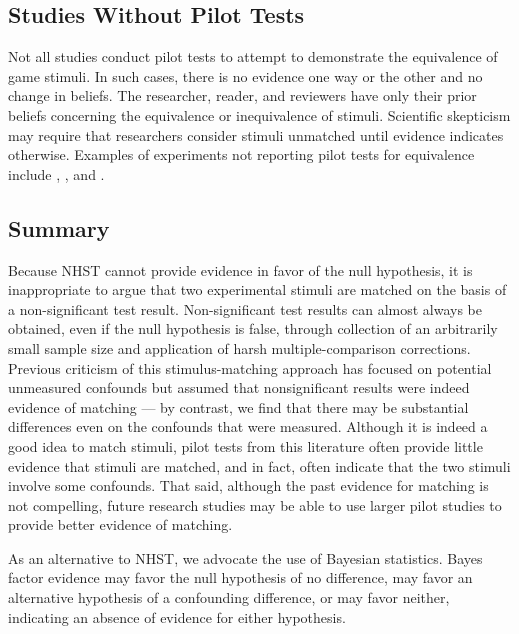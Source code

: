 \documentclass[man]{apa6}
\begin{document}
\subsection{Studies Without Pilot Tests}
Not all studies conduct pilot tests to attempt to demonstrate the equivalence of game stimuli. In such cases, there is no evidence one way or the other and no change in beliefs. The researcher, reader, and reviewers have only their prior beliefs concerning the equivalence or inequivalence of stimuli. Scientific skepticism may require that researchers consider stimuli unmatched until evidence indicates otherwise. Examples of experiments not reporting pilot tests for equivalence include \citet{Bartholow:Anderson:2002}, \citet{Bartholow:etal:2005}, and \citet{Hasan:etal:2012}. 

\subsection{Summary}
Because NHST cannot provide evidence in favor of the null hypothesis, it is inappropriate to argue that two experimental stimuli are matched on the basis of a non-significant test result.  Non-significant test results can almost always be obtained, even if the null hypothesis is false, through collection of an arbitrarily small sample size and application of harsh multiple-comparison corrections.  Previous criticism of this stimulus-matching approach has focused on potential unmeasured confounds but assumed that nonsignificant results were indeed evidence of matching --- by contrast, we find that there may be substantial differences even on the confounds that were measured. Although it is indeed a good idea to match stimuli, pilot tests from this literature often provide little evidence that stimuli are matched, and in fact, often indicate that the two stimuli involve some confounds. That said, although the past evidence for matching is not compelling, future research studies may be able to use larger pilot studies to provide better evidence of matching. 

As an alternative to NHST, we advocate the use of Bayesian statistics. Bayes factor evidence may favor the null hypothesis of no difference, may favor an alternative hypothesis of a confounding difference, or may favor neither, indicating an absence of evidence for either hypothesis. 
\end{document}
